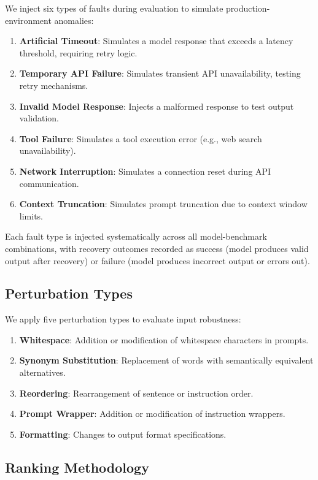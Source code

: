 We inject six types of faults during evaluation to simulate production-environment anomalies:

\begin{enumerate}
    \item \textbf{Artificial Timeout}: Simulates a model response that exceeds a latency threshold, requiring retry logic.
    \item \textbf{Temporary API Failure}: Simulates transient API unavailability, testing retry mechanisms.
    \item \textbf{Invalid Model Response}: Injects a malformed response to test output validation.
    \item \textbf{Tool Failure}: Simulates a tool execution error (e.g., web search unavailability).
    \item \textbf{Network Interruption}: Simulates a connection reset during API communication.
    \item \textbf{Context Truncation}: Simulates prompt truncation due to context window limits.
\end{enumerate}

Each fault type is injected systematically across all model-benchmark combinations, with recovery outcomes recorded as success (model produces valid output after recovery) or failure (model produces incorrect output or errors out).

\subsection{Perturbation Types}

We apply five perturbation types to evaluate input robustness:

\begin{enumerate}
    \item \textbf{Whitespace}: Addition or modification of whitespace characters in prompts.
    \item \textbf{Synonym Substitution}: Replacement of words with semantically equivalent alternatives.
    \item \textbf{Reordering}: Rearrangement of sentence or instruction order.
    \item \textbf{Prompt Wrapper}: Addition or modification of instruction wrappers.
    \item \textbf{Formatting}: Changes to output format specifications.
\end{enumerate}

\subsection{Ranking Methodology}

